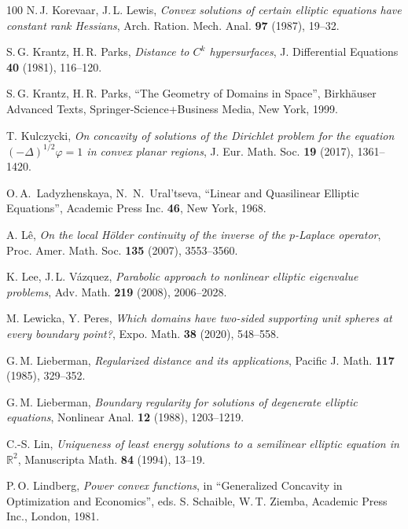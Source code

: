 \documentclass[11pt, reqno]{amsart}
\theoremstyle{definition}
\numberwithin{equation}{section}
\newcommand{\R}{\mathbb{R}}
\begin{document}
\begin{thebibliography}{100}
 N.$\,$J. Korevaar, J.$\,$L. Lewis,
\emph{Convex solutions of certain elliptic equations have constant rank Hessians},
Arch. Ration. Mech. Anal. \textbf{97} (1987), %
19--32.

 S.$\,$G. Krantz, H.$\,$R. Parks,
\emph{Distance to $C^k$ hypersurfaces},
J. Differential Equations \textbf{40} (1981), %
116--120.

 S.$\,$G. Krantz, H.$\,$R. Parks,
``The Geometry of Domains in Space'',
Birkhäuser Advanced Texts, Springer-Science+Business Media, New York, 1999.

 T. Kulczycki,
\emph{On concavity of solutions of the Dirichlet problem for the equation $(-\Delta)^{1/2} \varphi =1$ in convex planar regions},
J. Eur. Math. Soc. \textbf{19} (2017), %
1361--1420.

 O.$\,$A.\ Ladyzhenskaya, N.\ N.\ Ural'tseva, 
``Linear and Quasilinear Elliptic Equations'', 
Academic Press Inc. \textbf{46}, New York, 1968.

 A. Lê,
\emph{On the local Hölder continuity of the inverse of the $p$-Laplace operator},
Proc. Amer. Math. Soc. \textbf{135} (2007), %
3553--3560.

 K. Lee, J.$\,$L. Vázquez,
\emph{Parabolic approach to nonlinear elliptic eigenvalue problems},
Adv. Math. \textbf{219} (2008), %
2006--2028.

 M. Lewicka, Y. Peres,
\emph{Which domains have two-sided supporting unit spheres at every boundary point?},
Expo. Math. \textbf{38} (2020), %
548--558.

 G.$\,$M. Lieberman,
\emph{Regularized distance and its applications},
Pacific J. Math. \textbf{117} (1985), %
329--352.

 G.$\,$M. Lieberman,
\emph{Boundary regularity for solutions of degenerate elliptic equations},
Nonlinear Anal. \textbf{12} (1988), %
1203--1219.

 C.-S. Lin,
\emph{Uniqueness of least energy solutions to a semilinear elliptic equation in $\R^2$},
Manuscripta Math. \textbf{84} (1994), %
13--19.
 
 P.$\,$O. Lindberg,
\emph{Power convex functions},
in ``Generalized Concavity in Optimization and Economics'', eds. S. Schaible, W.$\,$T. Ziemba, Academic Press Inc., London, 1981.


\end{thebibliography}
\end{document}
